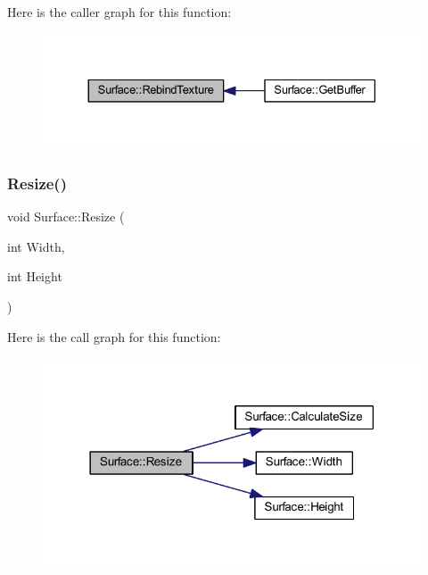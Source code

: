 Here is the caller graph for this function\+:\nopagebreak
\begin{figure}[H]
\begin{center}
\leavevmode
\includegraphics[width=330pt]{class_surface_aa75c49f53fec5c49ba8422c0d64815e6_icgraph}
\end{center}
\end{figure}
\mbox{\label{class_surface_a5e45e936e3057fa1ddad0c7924767005}} 
\subsubsection{\texorpdfstring{Resize()}{Resize()}}
{\footnotesize\ttfamily void Surface\+::\+Resize (\begin{DoxyParamCaption}\item[{int}]{Width,  }\item[{int}]{Height }\end{DoxyParamCaption})}

Here is the call graph for this function\+:\nopagebreak
\begin{figure}[H]
\begin{center}
\leavevmode
\includegraphics[width=318pt]{class_surface_a5e45e936e3057fa1ddad0c7924767005_cgraph}
\end{center}
\end{figure}
\mbox{\label{class_surface_a377c59f6ef131d4b879cda93578a3efa}} 
